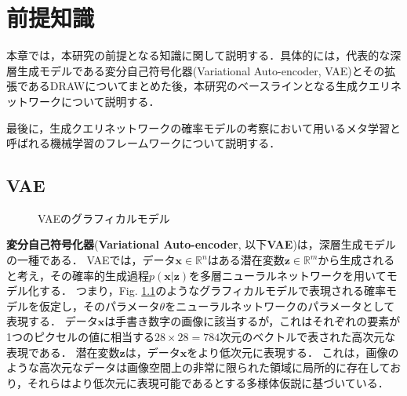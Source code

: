 \chapter{前提知識}
\label{chap:prerequisite}
本章では，本研究の前提となる知識に関して説明する．具体的には，代表的な深層生成モデルである変分自己符号化器(Variational Auto-encoder, VAE)とその拡張であるDRAWについてまとめた後，本研究のベースラインとなる生成クエリネットワークについて説明する．

最後に，生成クエリネットワークの確率モデルの考察において用いるメタ学習と呼ばれる機械学習のフレームワークについて説明する．

\section{VAE}
\label{section:VAE}

\begin{figure}[tbp]
\begin{center}
\caption{VAEのグラフィカルモデル}
\label{fig:gm_vae}
\end{center}
\end{figure}

{\bf 変分自己符号化器}({\bf Variational Auto-encoder}, 以下{\bf VAE})\cite{vae}は，深層生成モデルの一種である．
VAEでは，データ$\bm{x} \in \mathbb{R}^n$はある潜在変数$\bm{z} \in \mathbb{R}^m$から生成されると考え，その確率的生成過程$p(\bm{x}|\bm{z})$を多層ニューラルネットワークを用いてモデル化する．
つまり，Fig. \ref{fig:gm_vae}のようなグラフィカルモデルで表現される確率モデルを仮定し，そのパラメータ$\theta$をニューラルネットワークのパラメータとして表現する．
データ$\bm{x}$は手書き数字の画像に該当するが，これはそれぞれの要素が1つのピクセルの値に相当する$28\times28=784$次元のベクトルで表された高次元な表現である．
潜在変数$\bm{z}$は，データ$\bm{x}$をより低次元に表現する．
これは，画像のような高次元なデータは画像空間上の非常に限られた領域に局所的に存在しており，それらはより低次元に表現可能であるとする多様体仮説に基づいている．

